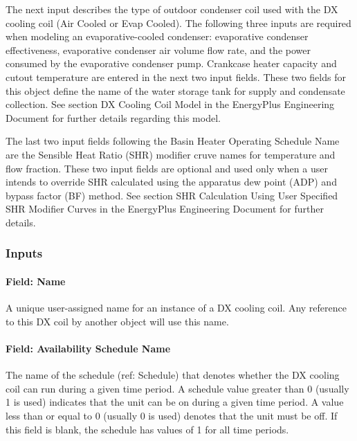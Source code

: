 The next input describes the type of outdoor condenser coil used with the DX cooling coil (Air Cooled or Evap Cooled). The following three inputs are required when modeling an evaporative-cooled condenser: evaporative condenser effectiveness, evaporative condenser air volume flow rate, and the power consumed by the evaporative condenser pump. Crankcase heater capacity and cutout temperature are entered in the next two input fields. These two fields for this object define the name of the water storage tank for supply and condensate collection. See section DX Cooling Coil Model in the EnergyPlus Engineering Document for further details regarding this model.

The last two input fields following the Basin Heater Operating Schedule Name are the Sensible Heat Ratio (SHR) modifier cruve names for temperature and flow fraction. These two input fields are optional and used only when a user intends to override SHR calculated using the apparatus dew point (ADP) and bypass factor (BF) method. See section SHR Calculation Using User Specified SHR Modifier Curves in the EnergyPlus Engineering Document for further details.

\subsubsection{Inputs}\label{inputs-13-004}

\paragraph{Field: Name}\label{field-name-12-003}

A unique user-assigned name for an instance of a DX cooling coil. Any reference to this DX coil by another object will use this name.

\paragraph{Field: Availability Schedule Name}\label{field-availability-schedule-name-6-001}

The name of the schedule (ref: Schedule) that denotes whether the DX cooling coil can run during a given time period. A schedule value greater than 0 (usually 1 is used) indicates that the unit can be on during a given time period. A value less than or equal to 0 (usually 0 is used) denotes that the unit must be off. If this field is blank, the schedule has values of 1 for all time periods.

